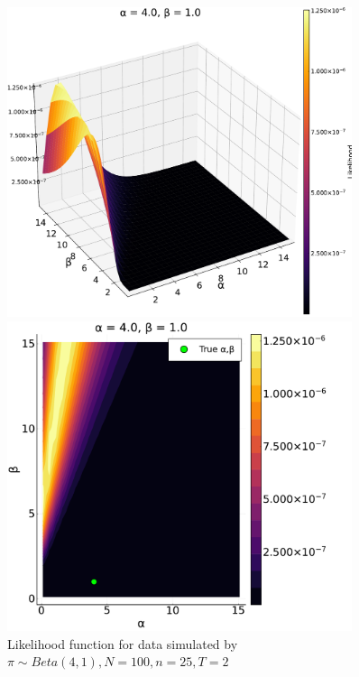 \documentclass[a4paper, 12pt]{article}
\begin{document}
\begin{figure}
    \centering
    \begin{minipage}{0.55\textwidth}
        \centering
        \includegraphics[width=0.9\textwidth]{../figures/Likelihood_sfplt_3.pdf} %
    \end{minipage}\hfill
    \begin{minipage}{0.45\textwidth}
        \centering
        \includegraphics[width=0.9\textwidth]{../figures/Likelihood_contplt_3.pdf} %
    \end{minipage}
    \caption{\small Likelihood function for data simulated by $\pi \sim Beta(4, 1), N = 100, n = 25, T = 2$}
\end{figure}
\end{document}
